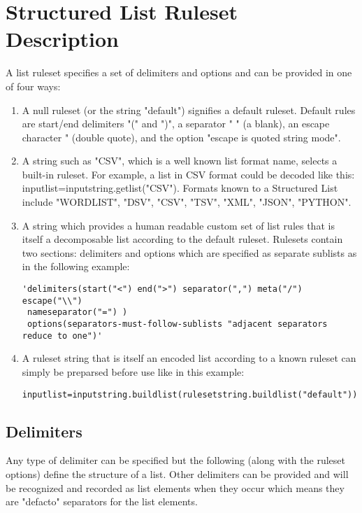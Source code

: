 \section{Structured List Ruleset Description}

A list ruleset specifies a set of delimiters and options and can be provided in one of four ways:
\begin{enumerate}
\item A null ruleset (or the string "default") signifies a default ruleset. Default rules are start/end delimiters "(" and ")", a separator " " (a blank), an escape character " (double quote), and the option "escape is quoted string mode".

\item A string such as "CSV", which is a well known list format name, selects a built-in ruleset. For example, a list in CSV format could be decoded like this: inputlist=inputstring.getlist("CSV"). Formats known to a Structured List include "WORDLIST", "DSV", "CSV", "TSV", "XML", "JSON", "PYTHON".

\item A string which provides a human readable custom set of list rules that is itself a decomposable list according to the default ruleset. Rulesets contain two sections: delimiters and options which are specified as separate sublists as in the following example: 

\begin{verbatim}
'delimiters(start("<") end(">") separator(",") meta("/") escape("\\")
 nameseparator("=") ) 
 options(separators-must-follow-sublists "adjacent separators reduce to one")'
\end{verbatim}
\item A ruleset string that is itself an encoded list according to a
  known ruleset can simply be preparsed before use like in this
  example: 
\begin{verbatim}
inputlist=inputstring.buildlist(rulesetstring.buildlist("default"))
\end{verbatim}
\end{enumerate}

\subsection{Delimiters}

Any type of delimiter can be specified but the following (along with the ruleset options) define the structure of a list. Other delimiters can be provided and will be recognized and recorded as list elements when they occur which means they are "defacto" separators for the list elements.

